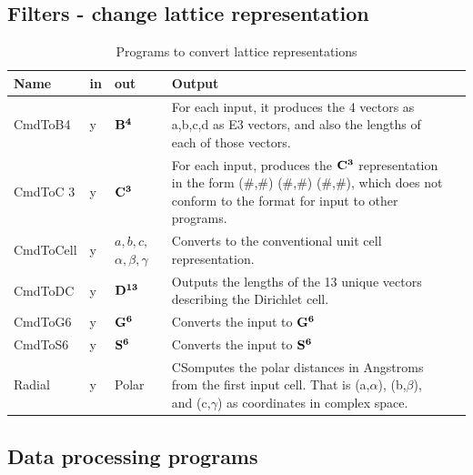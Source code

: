 \documentclass[preprint]{iucr}              %
\numberwithin{equation}{section}
\newcommand{\BIV}[0]{$\bf{B^{4}}$}
\newcommand{\SVI}[0]{$\bf{S^{6}}$}
\newcommand{\GVI}[0]{$\bf{G^{6}}$}
\newcommand{\CIII}[0]{$\bf{C^{3}}$}
\newcommand{\DXIII}[0]{$\bf{D^{13}}$}
\begin{document}
	\subsection{Filters - change lattice representation}
	
	\begin{table}
		\renewcommand{\arraystretch}{1.2}
		\caption{Programs to convert lattice representations}
		\begin{tabular}{l l l p{}  l}
			\toprule
			Name		&	in	&	out				& Output	\\
			\midrule
			CmdToB4		&	y	&	\BIV{}		&		For each input, 
			it produces the 4 vectors as a,b,c,d as E3 vectors, 
			and also the lengths of each of those vectors.\\[.9pt]
			CmdToC	3	&	y	&	\CIII{	}	&		
			For each input, produces the \CIII{} representation in the form 
			(\#,\#) (\#,\#) (\#,\#), 
			which does not conform to the format for input to other programs.\\[.9pt]
			CmdToCell	&	y	&	
			\parbox[t]{0.07\textwidth}{${	a,b,c,}$ \\ ${\alpha,\beta,\gamma}$}		&		
			Converts to the conventional unit cell representation.\\[.9pt]
			CmdToDC		&	y	&	\DXIII{}		&	Outputs the lengths of the 13 unique vectors describing the Dirichlet cell.\\[.9pt]			
			CmdToG6		&	y	&	\GVI{}		&		Converts the input to \GVI{}\\[.9pt]
			CmdToS6		&	y	&	\SVI{}		&		Converts the input to \SVI{}\\[.9pt]
			Radial		&	y	&	Polar	&
				CSomputes the polar distances in Angstroms 
				from the first input cell. 
				That is {(a,$\alpha$)}, {(b,$\beta$)}, and {(c,$\gamma$)} 
				as coordinates in complex space.\\[.9pt]
			\bottomrule
			
		\end{tabular}
	\end{table}

\subsection{Data processing programs}
\end{document}
